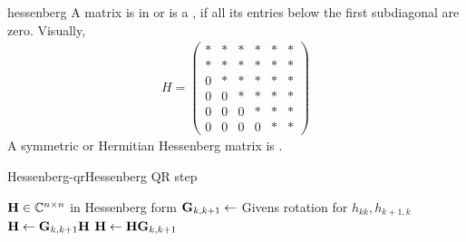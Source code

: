 \begin{Definition}{hessenberg}
  A matrix is in  or is a , if all its entries below the first subdiagonal are zero. Visually,
  \begin{gather}
    H = 
    \begin{pmatrix}
      *&*&*&*&*&*\\
      *&*&*&*&*&*\\
      0&*&*&*&*&*\\
      0&0&*&*&*&*\\
      0&0&0&*&*&*\\
      0&0&0&0&*&*
    \end{pmatrix}
  \end{gather}
  A symmetric or Hermitian Hessenberg matrix is .
\end{Definition}

\begin{Algorithm*}{Hessenberg-qr}{Hessenberg QR step}
  \begin{algorithmic}[1]
    \Require $\mathbf H\in\mathbb C^{n\times n}$ in Hessenberg form
    \State $\mathbf G_{k,k+1} \gets$ Givens rotation for $h_{kk},h_{k+1,k}$
    \State $\mathbf H\gets \mathbf G_{k,k+1}\mathbf H$
    \EndFor
    \Comment{$\matH = \matr\matq$}
    \State $\mathbf H\gets \mathbf H\mathbf G_{k,k+1}$    
    \EndFor
  \end{algorithmic}  
\end{Algorithm*}

